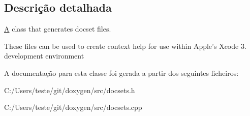 \subsection{Descrição detalhada}
\hyperlink{class_a}{A} class that generates docset files.

These files can be used to create context help for use within Apple's Xcode 3. development environment 

A documentação para esta classe foi gerada a partir dos seguintes ficheiros\-:\begin{DoxyCompactItemize}
\item 
C\-:/\-Users/teste/git/doxygen/src/docsets.\-h\item 
C\-:/\-Users/teste/git/doxygen/src/docsets.\-cpp\end{DoxyCompactItemize}
